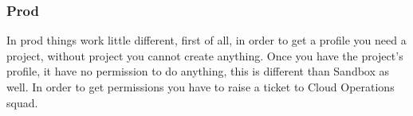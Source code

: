\subsubsection*{Prod} \label{prod}

In prod things work little different, first of all, in order to get a profile you need a project, without project you cannot create anything. Once you have the project's profile, it have no permission to do anything, this is different than Sandbox as well. In order to get permissions you have to raise a ticket to Cloud Operations squad.

